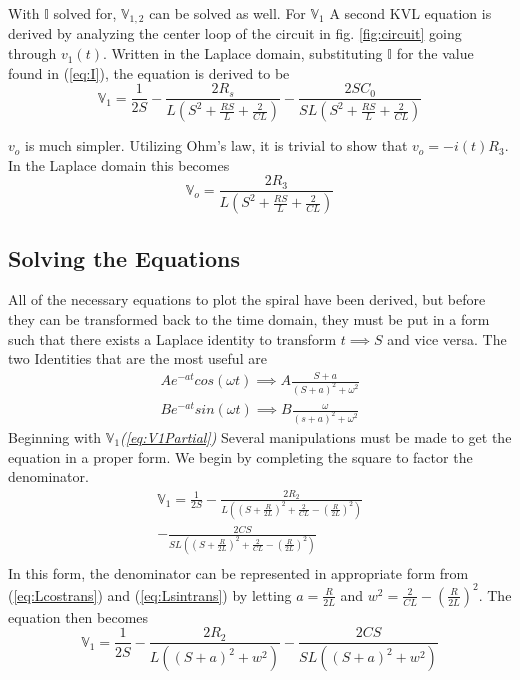 \documentclass[conference]{IEEEtran}
\begin{document}
With $\mathbb{I}$ solved for, ${{\mathbb{V}}_{1,2}}$ can be solved as well. For ${{\mathbb{V}}_1}$ A second KVL equation is derived by analyzing the center loop of the circuit in fig. \ref{fig:circuit} going through $v_1(t)$. Written in the Laplace domain, substituting $\mathbb{I}$ for the value found in (\ref{eq:I}), the equation is derived to be
\begin{equation} \label{eq:V1Partial}
    {\mathbb{V}}_1 = \frac{1}{2S} - \frac{2R_s}{L(S^2 + \frac{RS}{L} + \frac{2}{CL})} - \frac{2SC_0}{SL(S^2 + \frac{RS}{L} + \frac{2}{CL})}
\end{equation}

$v_o$ is much simpler. Utilizing Ohm's law, it is trivial to show that ${v_o} = -i(t)R_3$. In the Laplace domain this becomes
\begin{equation} \label{eq:VoPartial}
{\mathbb{V}}_o = \frac{2R_3}{L(S^2 + \frac{RS}{L} + \frac{2}{CL})}
\end{equation}
\subsection{Solving the Equations}
All of the necessary equations to plot the spiral have been derived, but before they can be transformed
back to the time domain, they must be put in a form such that there exists a Laplace identity to transform
$t\implies{S}$ and vice versa. The two Identities that are the most useful are
\begin{align} \label{eq:Lcostrans}
    Ae^{-at}cos(\omega{t}) \implies A\frac{S+a}{(S+a)^2 + \omega^2}\\
    \label{eq:Lsintrans}
    Be^{-at}sin(\omega{t}) \implies B\frac{\omega}{(s+a)^2 + \omega^2}
\end{align}
Beginning with ${\mathbb{V}}_1$\textit{(\ref{eq:V1Partial})} Several manipulations must be made to get the equation in a proper form. We begin by completing the square to factor the denominator.
\begin{multline*}
    {\mathbb{V}}_1 = \frac{1}{2S} - \frac{2R_2}{L((S + \frac{R}{2L})^2 + \frac{2}{CL}- (\frac{R}{2L})^2)}\\
    - \frac{2CS}{SL((S + \frac{R}{2L})^2 + \frac{2}{CL} - (\frac{R}{2L})^2)}\\
    {}
\end{multline*}
In this form, the denominator can be represented in appropriate form from (\ref{eq:Lcostrans}) and (\ref{eq:Lsintrans}) by letting $a = \frac{R}{2L}$ and $w^2 = \frac{2}{CL}- (\frac{R}{2L})^2$.
The equation then becomes
\begin{equation*}
    {\mathbb{V}}_1 = \frac{1}{2S} - \frac{2R_2}{L((S+a)^2 + w^2)} - \frac{2CS}{SL((S+a)^2 + w^2)}
\end{equation*}
\end{document}
